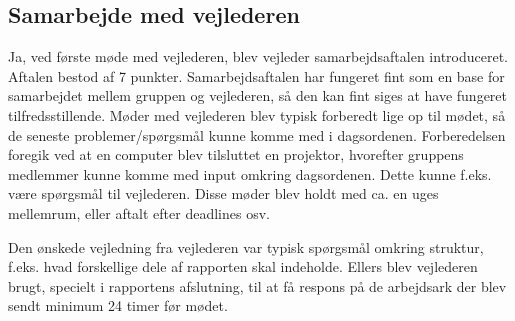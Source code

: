 \subsection{Samarbejde med vejlederen}


Ja, ved første møde med vejlederen, blev vejleder samarbejdsaftalen introduceret. Aftalen bestod af 7 punkter. Samarbejdsaftalen har fungeret fint som en base for samarbejdet mellem gruppen og vejlederen, så den kan fint siges at have fungeret tilfredsstillende. Møder med vejlederen blev typisk forberedt lige op til mødet, så de seneste problemer/spørgsmål kunne komme med i dagsordenen. Forberedelsen foregik ved at en computer blev tilsluttet en projektor, hvorefter gruppens medlemmer kunne komme med input omkring dagsordenen. Dette kunne f.eks. være spørgsmål til vejlederen. Disse møder blev holdt med ca. en uges mellemrum, eller aftalt efter deadlines osv.

Den ønskede vejledning fra vejlederen var typisk spørgsmål omkring struktur, f.eks. hvad forskellige dele af rapporten skal indeholde. Ellers blev vejlederen brugt, specielt i rapportens afslutning, til at få respons på de arbejdsark der blev sendt minimum 24 timer før mødet.